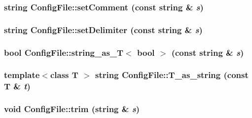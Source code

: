 \label{classConfigFile_afca295f72101b138ad2702a11c342f37}
\hypertarget{classConfigFile_a2e06b3000fb45426c975b334b2cee148}{
\subsubsection[{setComment}]{\setlength{\rightskip}{0pt plus 5cm}string ConfigFile::setComment (const string \& {\em s})}}
\label{classConfigFile_a2e06b3000fb45426c975b334b2cee148}
\hypertarget{classConfigFile_af28390aba7d8f399ac734c074e659b99}{
\subsubsection[{setDelimiter}]{\setlength{\rightskip}{0pt plus 5cm}string ConfigFile::setDelimiter (const string \& {\em s})}}
\label{classConfigFile_af28390aba7d8f399ac734c074e659b99}
\hypertarget{classConfigFile_a741caa76c057b33332439cce2521b27e}{
\subsubsection[{string\_\-as\_\-T}]{\setlength{\rightskip}{0pt plus 5cm}bool ConfigFile::string\_\-as\_\-T$<$ bool $>$ (const string \& {\em s})}}
\label{classConfigFile_a741caa76c057b33332439cce2521b27e}
\hypertarget{classConfigFile_a0b2ef4a39ca6ea31d186c301f1f52700}{
\subsubsection[{T\_\-as\_\-string}]{\setlength{\rightskip}{0pt plus 5cm}template$<$class T $>$ string ConfigFile::T\_\-as\_\-string (const T \& {\em t})}}
\label{classConfigFile_a0b2ef4a39ca6ea31d186c301f1f52700}
\hypertarget{classConfigFile_a6b445b393fcf42386a804fc4077fac10}{
\subsubsection[{trim}]{\setlength{\rightskip}{0pt plus 5cm}void ConfigFile::trim (string \& {\em s})}}
\label{classConfigFile_a6b445b393fcf42386a804fc4077fac10}


